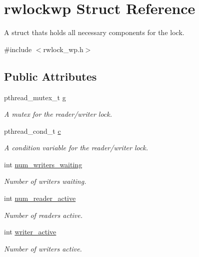 \hypertarget{structrwlockwp}{}\section{rwlockwp Struct Reference}
\label{structrwlockwp}


A struct thats holds all necessary components for the lock.  




{\ttfamily \#include $<$rwlock\+\_\+wp.\+h$>$}

\subsection*{Public Attributes}
\begin{DoxyCompactItemize}
\item 
\mbox{\label{structrwlockwp_aadde32e3b40cb009fe22e7971c612d40}} 
pthread\+\_\+mutex\+\_\+t \mbox{\hyperlink{structrwlockwp_aadde32e3b40cb009fe22e7971c612d40}{g}}
\begin{DoxyCompactList}\small\item\em A mutex for the reader/writer lock. \end{DoxyCompactList}\item 
\mbox{\label{structrwlockwp_acc2d2410bf5f9e811503673564745037}} 
pthread\+\_\+cond\+\_\+t \mbox{\hyperlink{structrwlockwp_acc2d2410bf5f9e811503673564745037}{c}}
\begin{DoxyCompactList}\small\item\em A condition variable for the reader/writer lock. \end{DoxyCompactList}\item 
\mbox{\label{structrwlockwp_a6142e0315230df07be53a757b1341ea0}} 
int \mbox{\hyperlink{structrwlockwp_a6142e0315230df07be53a757b1341ea0}{num\+\_\+writers\+\_\+waiting}}
\begin{DoxyCompactList}\small\item\em Number of writers waiting. \end{DoxyCompactList}\item 
\mbox{\label{structrwlockwp_a3de1a0126b2eb5687577561e23c9f153}} 
int \mbox{\hyperlink{structrwlockwp_a3de1a0126b2eb5687577561e23c9f153}{num\+\_\+reader\+\_\+active}}
\begin{DoxyCompactList}\small\item\em Number of readers active. \end{DoxyCompactList}\item 
\mbox{\label{structrwlockwp_a729763a8ff541dbe85d809e01fbaf5ad}} 
int \mbox{\hyperlink{structrwlockwp_a729763a8ff541dbe85d809e01fbaf5ad}{writer\+\_\+active}}
\begin{DoxyCompactList}\small\item\em Number of writers active. \end{DoxyCompactList}\end{DoxyCompactItemize}


